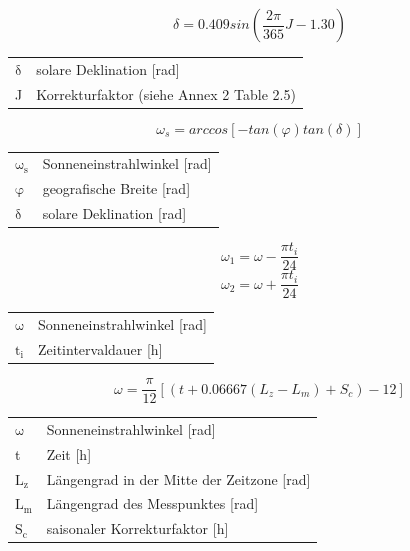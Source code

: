 \begin{description}
\begin{equation}
\label{eq:delta_radiation}
\delta=0.409sin\left(\frac{2\pi}{365}J-1.30\right)
\end{equation}
\begin{table}[H]
\centering
\begin{tabular}{ll}
$\mathrm{\delta}$ & solare Deklination [rad]\\
J & Korrekturfaktor (siehe \cite{fao} Annex 2 Table 2.5)\\
\end{tabular}
\end{table}

\begin{equation}
\label{eq:omega_s}
\omega_s=arccos[-tan(\varphi)tan(\delta)]
\end{equation}
\begin{table}[H]
\centering
\begin{tabular}{ll}
$\mathrm{\omega_s}$ & Sonneneinstrahlwinkel [rad]\\
$\mathrm{\varphi}$ & geografische Breite [rad]\\
$\mathrm{\delta}$ & solare Deklination [rad]\\
\end{tabular}
\end{table}

\begin{equation}
\label{eq:omega_i}
\omega_1=\omega-\frac{\pi t_i}{24}
\end{equation}
\begin{equation}
\omega_2=\omega+\frac{\pi t_i}{24}
\end{equation}
\begin{table}[H]
\centering
\begin{tabular}{ll}
$\mathrm{\omega}$ & Sonneneinstrahlwinkel [rad]\\
$\mathrm{t_i}$ & Zeitintervaldauer [h]\\
\end{tabular}
\end{table}

\begin{equation}
\label{eq:omega}
\omega=\frac{\pi}{12}[(t+0.06667(L_z-L_m)+S_c)-12]
\end{equation}
\begin{table}[H]
\centering
\begin{tabular}{ll}
$\mathrm{\omega}$ & Sonneneinstrahlwinkel [rad]\\
t & Zeit [h]\\
$\mathrm{L_z}$ & Längengrad in der Mitte der Zeitzone [rad]\\
$\mathrm{L_m}$ & Längengrad des Messpunktes [rad]\\
$\mathrm{S_c}$ & saisonaler Korrekturfaktor [h]\\
\end{tabular}
\end{table}


\end{description}
